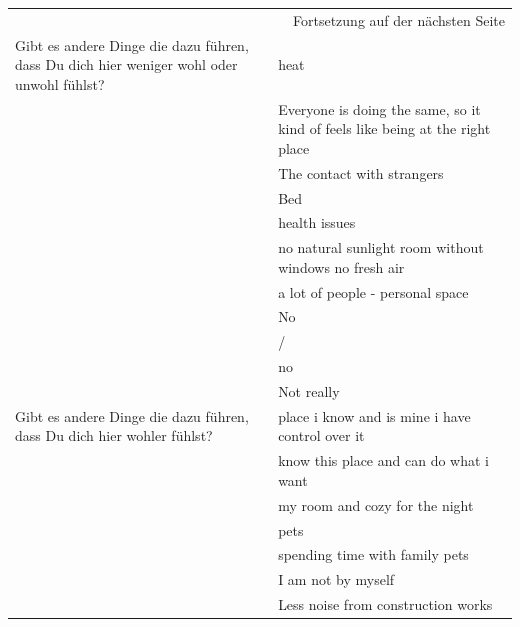 \begin{appendices}
\begin{longtable}{p{5.5cm}p{9.5cm}}
    \midrule
    \multicolumn{2}{r}{Fortsetzung auf der nächsten Seite}\\
    \endfoot
    
    \bottomrule
    \endlastfoot

    Gibt es andere Dinge die dazu führen, dass Du dich hier weniger wohl oder unwohl fühlst? & heat \\*
     & Everyone is doing the same, so it kind of feels like being at the right place \\*
     & The contact with strangers \\*
     & Bed \\*
     & health issues \\*
     & no natural sunlight room without windows no fresh air \\*
     & a lot of people - personal space \\*
     & No \\*
     & / \\*
     & no \\*
     & Not really \\
    \midrule
    \addlinespace
    Gibt es andere Dinge die dazu führen, dass Du dich hier wohler fühlst? & place i know and is mine i have control over it \\*
     & know this place and can do what i want \\*
     & my room and cozy for the night \\*
     & pets \\*
     & spending time with family pets \\*
     & I am not by myself \\*
     & Less noise from construction works \\
    \bottomrule
\end{longtable}



\end{appendices}
